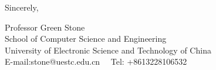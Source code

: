 \documentclass{article}
\begin{document}
\bigskip %

Sincerely,

\vspace{30pt} %

Professor Green Stone\\
School of Computer Science and Engineering\\
University of Electronic Science and Technology of China\\
E-mail:stone@uestc.edu.cn~ \ Tel: +8613228106532


\end{document}
